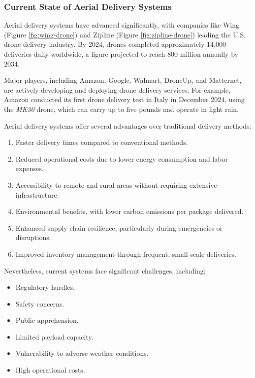\documentclass[12pt]{article}
\begin{document}
\subsubsection{Current State of Aerial Delivery Systems}
Aerial delivery systems have advanced significantly, with companies like Wing (Figure \ref{fig:wing-drone}) and Zipline (Figure \ref{fig:zipline-drone}) leading the U.S. drone delivery industry. By 2024, drones completed approximately 14,000 deliveries daily worldwide, a figure projected to reach 800 million annually by 2034.

Major players, including Amazon, Google, Walmart, DroneUp, and Matternet, are actively developing and deploying drone delivery services. For example, Amazon conducted its first drone delivery test in Italy in December 2024, using the \textit{MK30} drone, which can carry up to five pounds and operate in light rain.

Aerial delivery systems offer several advantages over traditional delivery methods:
\begin{enumerate}
    \item Faster delivery times compared to conventional methods.
    \item Reduced operational costs due to lower energy consumption and labor expenses.
    \item Accessibility to remote and rural areas without requiring extensive infrastructure.
    \item Environmental benefits, with lower carbon emissions per package delivered.
    \item Enhanced supply chain resilience, particularly during emergencies or disruptions.
    \item Improved inventory management through frequent, small-scale deliveries.
\end{enumerate}

Nevertheless, current systems face significant challenges, including:
\begin{itemize}
    \item Regulatory hurdles.
    \item Safety concerns.
    \item Public apprehension.
    \item Limited payload capacity.
    \item Vulnerability to adverse weather conditions.
    \item High operational costs.
\end{itemize}
\end{document}
